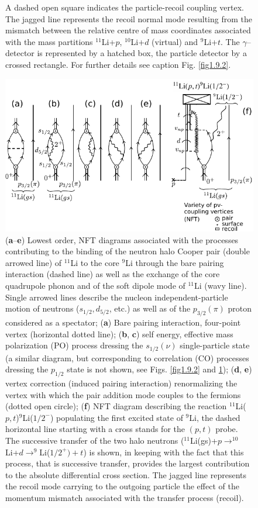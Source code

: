 \begin{figure}
{              	 A dashed open square  indicates the particle-recoil coupling vertex.
              	   The jagged line  represents the recoil normal mode resulting from the mismatch between the relative centre of mass coordinates  associated with  the mass partitions $^{11}$Li+$p$, $^{10}$Li+$d$ (virtual) and  $^9$Li+$t$. 
              	 The $\gamma$--detector is represented by a hatched box, the  particle detector  by a crossed rectangle. For further details see caption Fig. \ref{fig1.9.2}.}
          \label{fig1.9.3}
          \end{figure}
          \begin{figure}
          \centerline {
          \includegraphics*[width=12cm]{introduccion/figs/figintro5xx}
          }
          \caption{(\textbf{a}--\textbf{e}) Lowest order, NFT diagrams associated with the processes contributing  to the binding of the neutron halo Cooper pair (double arrowed line) of $^{11}$Li to the core $^9$Li through the bare pairing interaction (dashed line) as well as the  exchange of the core quadrupole phonon and of the soft dipole mode of $^{11}$Li (wavy line). Single arrowed lines describe the nucleon independent-particle motion of neutrons ($s_{1/2},d_{5/2}$, etc.) as well as of the $p_{3/2}(\pi)$ proton considered as a spectator;  (\textbf{a}) Bare pairing interaction, four-point vertex (horizontal dotted line); (\textbf{b}, \textbf{c}) self energy, effective mass polarization (PO) process dressing the $s_{1/2}(\nu)$ single-particle state (a similar diagram, but corresponding to correlation (CO) processes dressing the $p_{1/2}$ state is not shown, see Figs. \ref{fig1.9.2} and \ref{fig1.9.3}); (\textbf{d}, \textbf{e}) vertex correction (induced pairing interaction) renormalizing the  vertex with which the pair addition mode couples to the fermions (dotted open circle); (\textbf{f}) NFT diagram describing the reaction $^{11}$Li($p,t$)$^9$Li($1/2^-$) populating the first excited state of $^9$Li, the dashed horizontal line starting with a cross stands for the $(p,t)$ probe. The successive transfer of the two halo neutrons ($^{11}$Li(gs)+$p\rightarrow^{10}$Li+$d\rightarrow^9$Li($1/2^+)+t$) is shown, in keeping with the fact that this process, that is successive transfer, provides the largest contribution to the absolute differential cross section. The jagged line represents the recoil mode carrying  to the outgoing particle the effect of the momentum mismatch associated with the transfer process (recoil).}
          \label{figintro5}
          \end{figure}

